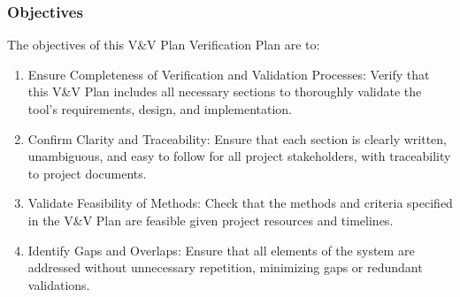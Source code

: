 \documentclass[12pt, titlepage]{article}
\begin{document}
\subsubsection{Objectives}
The objectives of this V\&V Plan Verification Plan are to:
\begin{enumerate}
  \item Ensure Completeness of Verification and Validation Processes: Verify that this V\&V Plan includes all necessary sections to thoroughly validate the tool’s requirements, design, and implementation.
  \item Confirm Clarity and Traceability: Ensure that each section is clearly written, unambiguous, and easy to follow for all project stakeholders, with traceability to project documents.
  \item Validate Feasibility of Methods: Check that the methods and criteria specified in the V\&V Plan are feasible given project resources and timelines.
  \item Identify Gaps and Overlaps: Ensure that all elements of the system are addressed without unnecessary repetition, minimizing gaps or redundant validations.
\end{enumerate}
\end{document}
